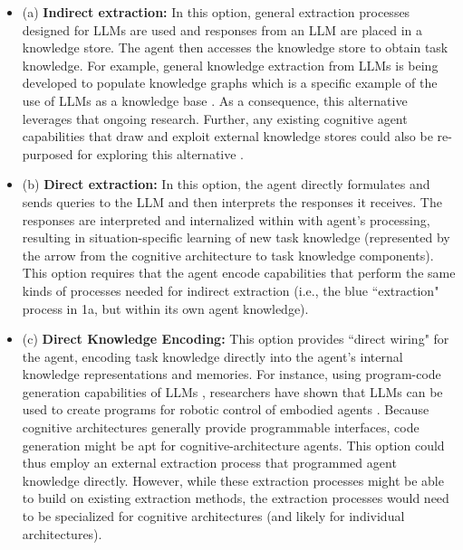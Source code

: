 \documentclass[letterpaper]{article} %
\begin{document}
\begin{itemize}

    \item (a) \textbf{Indirect extraction:} In this option,  general extraction processes designed for LLMs are used and responses from an LLM are placed in a knowledge store. The agent then accesses the knowledge store to obtain task knowledge. For example, general knowledge extraction from LLMs is being developed to populate knowledge graphs \cite{bosselut_comet_2019} which is a specific example of the use of LLMs as a knowledge base \cite{petroni_language_2019}. As a consequence, this alternative leverages that ongoing research. Further, any existing cognitive agent capabilities that draw and exploit external knowledge stores could also be re-purposed for exploring this alternative \cite{wray_language_2021}.
    \item (b) \textbf{Direct extraction:} In this option, the agent directly formulates and sends queries to the LLM and then interprets the responses it receives. The responses are interpreted and internalized within with agent's processing, resulting in situation-specific learning of new task knowledge (represented by the arrow from the cognitive architecture to task knowledge components). This option requires that the agent encode capabilities that perform the same kinds of processes needed for indirect extraction (i.e., the blue ``extraction" process in 1a, but within its own agent knowledge).
    \item (c) \textbf{Direct Knowledge Encoding:} This option provides ``direct wiring" for the agent,  encoding task knowledge directly into the agent's internal knowledge representations and memories. For instance, using program-code generation capabilities of LLMs \cite{chen_evaluating_2021,austin_program_2021}, researchers have shown that LLMs can be used to create programs for robotic control of embodied agents \cite{singh_progprompt_2023,brohan_rt-2_2023}. Because cognitive architectures generally provide programmable interfaces, code generation might be apt for cognitive-architecture agents. This option could thus employ an external extraction process that programmed agent knowledge directly. However, while these extraction processes might be able to build on existing extraction methods, the extraction processes would need to be specialized for cognitive architectures (and likely for individual architectures).

\end{itemize}
\end{document}
